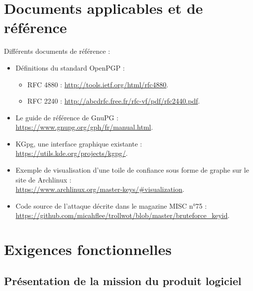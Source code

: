 \documentclass{../res/univ-projet}
\begin{document}
\section{Documents applicables et de référence}
Différents documents de référence :
\begin{itemize}
\item Définitions du standard OpenPGP :
  \begin{itemize}
    \item RFC 4880 : \href{http://tools.ietf.org/html/rfc4880}{http://tools.ietf.org/html/rfc4880}.
    \item RFC 2240 : \href{http://abcdrfc.free.fr/rfc-vf/pdf/rfc2440.pdf}{http://abcdrfc.free.fr/rfc-vf/pdf/rfc2440.pdf}.
  \end{itemize}
\item Le guide de référence de GnuPG : \href{https://www.gnupg.org/gph/fr/manual.html}{https://www.gnupg.org/gph/fr/manual.html}.
\item KGpg, une interface graphique existante : \href{https://utils.kde.org/projects/kgpg/}{https://utils.kde.org/projects/kgpg/}.
\item Exemple de visualisation d'une toile de confiance sous forme de graphe sur le site de Archlinux : \\
  \href{https://www.archlinux.org/master-keys/#visualization}{https://www.archlinux.org/master-keys/\#visualization}.
\item Code source de l'attaque décrite dans le magazine MISC n°75 : \\ 
\href{https://github.com/micahflee/trollwot/blob/master/bruteforce_keyid}{https://github.com/micahflee/trollwot/blob/master/bruteforce\_keyid}.
\end{itemize}



\section{Exigences fonctionnelles}
\subsection{Présentation de la mission du produit logiciel}
\end{document}
